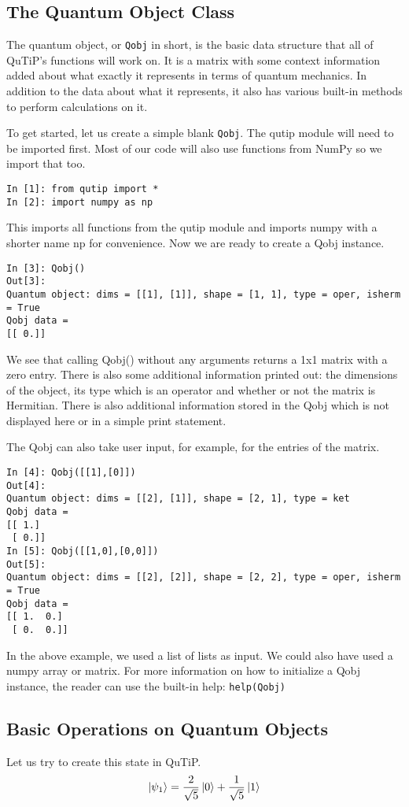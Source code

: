 \subsection{The Quantum Object Class}
The quantum object, or \texttt{Qobj} in short, is the basic data structure that all of QuTiP's functions will work on. It is a matrix with some context information added about what exactly it represents in terms of quantum mechanics. In addition to the data about what it represents, it also has various built-in methods to perform calculations on it.
\par To get started, let us create a simple blank \texttt{Qobj}. The qutip module will need to be imported first. Most of our code will also use functions from NumPy so we import that too.
\begin{verbatim}
In [1]: from qutip import *
In [2]: import numpy as np
\end{verbatim}
This imports all functions from the qutip module and imports numpy with a shorter name np for convenience. Now we are ready to create a Qobj instance.
\begin{verbatim}
In [3]: Qobj()
Out[3]:
Quantum object: dims = [[1], [1]], shape = [1, 1], type = oper, isherm = True
Qobj data =
[[ 0.]]
\end{verbatim}
We see that calling Qobj() without any arguments returns a 1x1 matrix with a zero entry. There is also some additional information printed out: the dimensions of the object, its type which is an operator and whether or not the matrix is Hermitian. There is also additional information stored in the Qobj which is not displayed here or in a simple print statement.
\par The Qobj can also take user input, for example, for the entries of the matrix.
\begin{verbatim}
In [4]: Qobj([[1],[0]])
Out[4]: 
Quantum object: dims = [[2], [1]], shape = [2, 1], type = ket
Qobj data =
[[ 1.]
 [ 0.]]
In [5]: Qobj([[1,0],[0,0]])
Out[5]: 
Quantum object: dims = [[2], [2]], shape = [2, 2], type = oper, isherm = True
Qobj data =
[[ 1.  0.]
 [ 0.  0.]]
\end{verbatim}
In the above example, we used a list of lists as input. We could also have used a numpy array or matrix. For more information on how to initialize a Qobj instance, the reader can use the built-in help: \texttt{help(Qobj)}

\subsection{Basic Operations on Quantum Objects}
Let us try to create this state in QuTiP.
\begin{align*}
\ket{\psi_1} = \frac{2}{\sqrt{5}} \ket{0} + \frac{1}{\sqrt{5}} \ket{1}
\end{align*}

